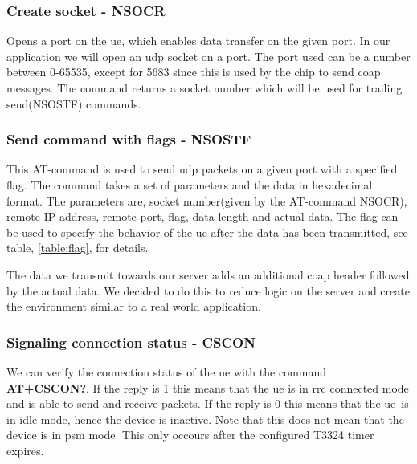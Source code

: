 \documentclass[USenglish]{ifimaster}  %
\begin{document}
\subsubsection{Create socket - NSOCR}
Opens a port on the \acrshort{ue}, which enables data transfer on the given port. In our application we will open an \acrshort{udp} socket on a port. The port used can be a number between 0-65535, except for 5683 since this is used by the chip to send \acrshort{coap} messages. The command returns a socket number which will be used for trailing send(NSOSTF) commands.

\subsubsection{Send command with flags - NSOSTF}
This AT-command is used to send \acrshort{udp} packets on a given port with a specified flag. The command takes a set of parameters and the data in hexadecimal format. The parameters are, socket number(given by the AT-command NSOCR), remote IP address, remote port, flag, data length and actual data. The flag can be used to specify the behavior of the \acrshort{ue} after the data has been transmitted, see table, \vref{table:flag}, for details.

\begin{table}[H]
\centering
{}
\caption[\acrshort{nb-iot} send command flag options]{Transmit flag options}
\label{table:flag}
\end{table}

The data we transmit towards our server adds an additional \acrshort{coap} header followed by the actual data. We decided to do this to reduce logic on the server and create the environment similar to a real world application.

\subsubsection{Signaling connection status - CSCON}
We can verify the connection status of the \acrshort{ue} with the command \textbf{AT+CSCON?}. If the reply is 1 this means that the \acrshort{ue} is in \acrshort{rrc} connected mode and is able to send and receive packets. If the reply is 0 this means that the \acrshort{ue} is in idle mode, hence the device is inactive. Note that this does not mean that the device is in \acrshort{psm} mode. This only occours after the configured \acrshort{T3324} timer expires.
\end{document}
